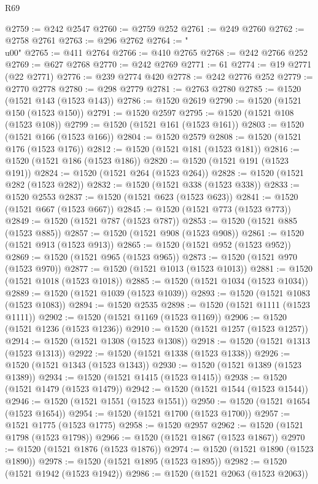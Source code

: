 \begin{lexlean}{R69}
\begin{coremodule}
{@2759 := @242 @2547
@2760 := @2759 @252
@2761 := @249 @2760
@2762 := @2758 @2761
@2763 := @296 @2762
@2764 := "\\u00"
@2765 := @411 @2764
@2766 := @410 @2765
@2768 := @242 @2766 @252
@2769 := @627 @2768
@2770 := @242 @2769
@2771 := 61
@2774 := @19 @2771 (@22 @2771)
@2776 := @239 @2774 @420
@2778 := @242 @2776 @252
@2779 := @2770 @2778
@2780 := @298 @2779
@2781 := @2763 @2780
@2785 := @1520 (@1521 @143 (@1523 @143))
@2786 := @1520 @2619
@2790 := @1520 (@1521 @150 (@1523 @150))
@2791 := @1520 @2597
@2795 := @1520 (@1521 @108 (@1523 @108))
@2799 := @1520 (@1521 @161 (@1523 @161))
@2803 := @1520 (@1521 @166 (@1523 @166))
@2804 := @1520 @2579
@2808 := @1520 (@1521 @176 (@1523 @176))
@2812 := @1520 (@1521 @181 (@1523 @181))
@2816 := @1520 (@1521 @186 (@1523 @186))
@2820 := @1520 (@1521 @191 (@1523 @191))
@2824 := @1520 (@1521 @264 (@1523 @264))
@2828 := @1520 (@1521 @282 (@1523 @282))
@2832 := @1520 (@1521 @338 (@1523 @338))
@2833 := @1520 @2553
@2837 := @1520 (@1521 @623 (@1523 @623))
@2841 := @1520 (@1521 @667 (@1523 @667))
@2845 := @1520 (@1521 @773 (@1523 @773))
@2849 := @1520 (@1521 @787 (@1523 @787))
@2853 := @1520 (@1521 @885 (@1523 @885))
@2857 := @1520 (@1521 @908 (@1523 @908))
@2861 := @1520 (@1521 @913 (@1523 @913))
@2865 := @1520 (@1521 @952 (@1523 @952))
@2869 := @1520 (@1521 @965 (@1523 @965))
@2873 := @1520 (@1521 @970 (@1523 @970))
@2877 := @1520 (@1521 @1013 (@1523 @1013))
@2881 := @1520 (@1521 @1018 (@1523 @1018))
@2885 := @1520 (@1521 @1034 (@1523 @1034))
@2889 := @1520 (@1521 @1039 (@1523 @1039))
@2893 := @1520 (@1521 @1083 (@1523 @1083))
@2894 := @1520 @2535
@2898 := @1520 (@1521 @1111 (@1523 @1111))
@2902 := @1520 (@1521 @1169 (@1523 @1169))
@2906 := @1520 (@1521 @1236 (@1523 @1236))
@2910 := @1520 (@1521 @1257 (@1523 @1257))
@2914 := @1520 (@1521 @1308 (@1523 @1308))
@2918 := @1520 (@1521 @1313 (@1523 @1313))
@2922 := @1520 (@1521 @1338 (@1523 @1338))
@2926 := @1520 (@1521 @1343 (@1523 @1343))
@2930 := @1520 (@1521 @1389 (@1523 @1389))
@2934 := @1520 (@1521 @1415 (@1523 @1415))
@2938 := @1520 (@1521 @1479 (@1523 @1479))
@2942 := @1520 (@1521 @1544 (@1523 @1544))
@2946 := @1520 (@1521 @1551 (@1523 @1551))
@2950 := @1520 (@1521 @1654 (@1523 @1654))
@2954 := @1520 (@1521 @1700 (@1523 @1700))
@2957 := @1521 @1775 (@1523 @1775)
@2958 := @1520 @2957
@2962 := @1520 (@1521 @1798 (@1523 @1798))
@2966 := @1520 (@1521 @1867 (@1523 @1867))
@2970 := @1520 (@1521 @1876 (@1523 @1876))
@2974 := @1520 (@1521 @1890 (@1523 @1890))
@2978 := @1520 (@1521 @1895 (@1523 @1895))
@2982 := @1520 (@1521 @1942 (@1523 @1942))
@2986 := @1520 (@1521 @2063 (@1523 @2063))
}
\end{coremodule}
\end{lexlean}
